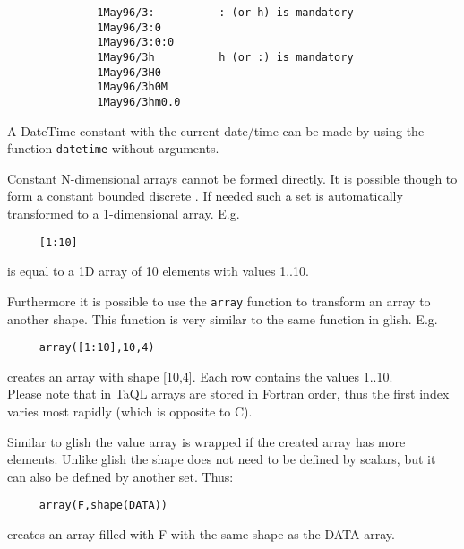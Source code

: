 \begin{itemize}
\begin{enumerate}
\begin{verbatim}
              1May96/3:          : (or h) is mandatory
              1May96/3:0
              1May96/3:0:0
              1May96/3h          h (or :) is mandatory
              1May96/3H0
              1May96/3h0M
              1May96/3hm0.0
              \end{verbatim}
              A DateTime constant with the current date/time can be made
              by using the function \texttt{datetime} without arguments.
       \end{enumerate}
\end{itemize}
Constant N-dimensional arrays cannot be formed directly.
It is possible though to form a constant bounded discrete
. If needed such a set is automatically
transformed to a 1-dimensional array. E.g.
\begin{verbatim}
     [1:10]
\end{verbatim}
is equal to a 1D array of 10 elements with values 1..10.

Furthermore it is possible to use the \texttt{array} function to
transform an array to another shape. This function is very similar to
the same function in glish. E.g.
\begin{verbatim}
     array([1:10],10,4)
\end{verbatim}
creates an array with shape [10,4]. Each row contains the values
1..10.
\\Please note that in TaQL arrays are stored in Fortran order, thus
the first index varies most rapidly (which is opposite to C).

Similar to glish the value array is wrapped if the created
array has more elements. Unlike glish the shape does not need to be
defined by scalars, but it can also be defined by another set. Thus:
\begin{verbatim}
     array(F,shape(DATA))
\end{verbatim}
creates an array filled with F with the same shape as the DATA array.


